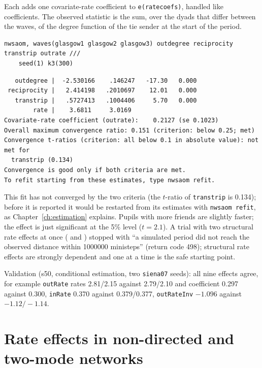 Each adds one covariate-rate coefficient to \texttt{e(ratecoefs)}, handled like  coefficients. The observed statistic is the sum, over the dyads that differ between the waves, of the degree function of the tie sender at the start of the period.

\begin{lstlisting}
nwsaom, waves(glasgow1 glasgow2 glasgow3) outdegree reciprocity transtrip outrate ///
    seed(1) k3(300)
\end{lstlisting}
\begin{lstlisting}
   outdegree |  -2.530166    .146247   -17.30   0.000
 reciprocity |   2.414198   .2010697    12.01   0.000
   transtrip |   .5727413   .1004406     5.70   0.000
        rate |    3.6811     3.0169
Covariate-rate coefficient (outrate):    0.2127 (se 0.1023)
Overall maximum convergence ratio: 0.151 (criterion: below 0.25; met)
Convergence t-ratios (criterion: all below 0.1 in absolute value): not met for
  transtrip (0.134)
Convergence is good only if both criteria are met.
To refit starting from these estimates, type nwsaom refit.
\end{lstlisting}
This fit has not converged by the two criteria (the $t$-ratio of \texttt{transtrip} is 0.134); before it is reported it would be restarted from its estimates with \texttt{nwsaom refit}, as Chapter~\ref{ch:estimation} explains. Pupils with more friends are slightly faster; the effect is just significant at the 5\% level ($t=2.1$). A trial with two structural rate effects at once ( and ) stopped with ``a simulated period did not reach the observed distance within 1000000 ministeps'' (return code 498); structural rate effects are strongly dependent and one at a time is the safe starting point.

Validation (s50, conditional estimation, two \texttt{siena07} seeds): all nine effects agree, for example \texttt{outRate} rates 2.81/2.15 against 2.79/2.10 and coefficient 0.297 against 0.300, \texttt{inRate} 0.370 against 0.379/0.377, \texttt{outRateInv} $-1.096$ against $-1.12/-1.14$.

\section{Rate effects in non-directed and two-mode networks}\label{sec:rate-newtypes}

